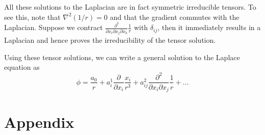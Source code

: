 \documentclass[11pt, letterpaper]{article}
\newcommand{\dij}{\delta_{ij}}
\newcommand{\1}{\bm{1}}
\newcommand{\pd}[2]{\frac{\partial #1}{\partial #2}}
\begin{document}
All these solutions to the Laplacian are in fact symmetric irreducible tensors. To see this, note that $\nabla ^2 (1/r) = 0$ and that the gradient commutes with the Laplacian. Suppose we contract $\frac{\partial ^3}{\partial x_i \partial x_j \partial x_k} \frac{1}{r}$ with $\dij$, then it immediately results in a Laplacian and hence proves the irreducibility of the tensor solution.

Using these tensor solutions, we can write a general solution to the Laplace equation as
$$
\phi = \frac{a_0}{r} + a^1_i\pd{}{x_i}\frac{x_i}{r^3} + a^2_{ij}\frac{\partial ^2}{\partial x_i \partial x_j}\frac{1}{r}+...
$$

\section{Appendix}
\end{document}
